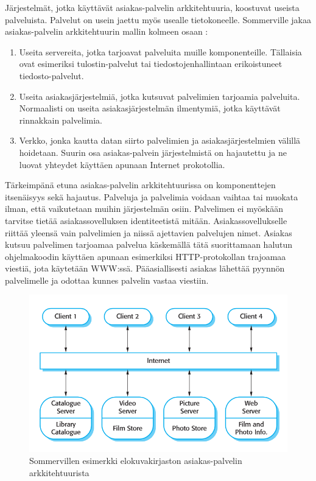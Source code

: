 \documentclass[utf8]{gradu3}
\begin{document}
Järjestelmät, jotka käyttävät asiakas-palvelin arkkitehtuuria, koostuvat useista palveluista. Palvelut on usein jaettu myös usealle tietokoneelle. Sommerville jakaa asiakas-palvelin arkkitehtuurin mallin kolmeen osaan \parencite[s. 161]{Sommerville}: 

\begin{enumerate}  
\item Useita servereita, jotka tarjoavat palveluita muille komponenteille. Tällaisia ovat esimeriksi tulostin-palvelut tai tiedostojenhallintaan erikoistuneet tiedosto-palvelut.
\item Useita asiakasjärjestelmiä, jotka kutsuvat palvelimien tarjoamia palveluita. Normaalisti on useita asiakasjärjestelmän ilmentymiä, jotka käyttävät rinnakkain palvelimia.
\item Verkko, jonka kautta datan siirto palvelimien ja asiakasjärjestelmien välillä hoidetaan. Suurin osa asiakas-palvein järjestelmistä on hajautettu ja ne luovat yhteydet käyttäen apunaan Internet prokotollia.
\end{enumerate}

Tärkeimpänä etuna asiakas-palvelin arkkitehtuurissa on komponenttejen itsenäisyys sekä hajautus. Palveluja ja palvelimia voidaan vaihtaa tai muokata ilman, että vaikutetaan muihin järjestelmän osiin. Palvelimen ei myöskään tarvitse tietää asiakassovelluksen identiteetistä mitään. Asiakassovellukselle riittää yleensä vain palvelimien ja niissä ajettavien palvelujen nimet. Asiakas kutsuu palvelimen tarjoamaa palvelua käskemällä tätä suorittamaan halutun ohjelmakoodin käyttäen apunaan esimerkiksi HTTP-protokollan trajoamaa viestiä, jota käytetään WWW:ssä. Pääasiallisesti asiakas lähettää pyynnön palvelimelle ja odottaa kunnes palvelin vastaa viestiin.

\begin{figure}[h]
\centering
\includegraphics[scale=0.85]{clientserver.png}
\caption{Sommervillen esimerkki elokuvakirjaston asiakas-palvelin arkkitehtuurista \parencite[s.162]{Sommerville}}
\end{figure}
\end{document}
